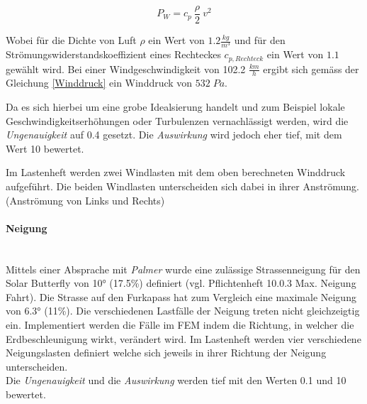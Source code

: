   \begin{equation}
    \label{Winddruck}
    P_W = c_p \: \frac{\rho}{2}\: v^2
  \end{equation}

  Wobei für die Dichte von Luft $\rho$ ein Wert von $1.2 \frac{kg}{m^3}$ und für den Strömungswiderstandskoeffizient eines Rechteckes $c_{p,Rechteck}$ ein Wert von $1.1$ gewählt wird. Bei einer Windgeschwindigkeit von 102.2 $\frac{km}{h}$ ergibt sich gemäss der Gleichung \ref{Winddruck} ein Winddruck von $532 \; Pa$.

  Da es sich hierbei um eine grobe Idealsierung handelt und zum Beispiel lokale Geschwindigkeitserhöhungen oder Turbulenzen vernachlässigt werden, wird die \emph{Ungenauigkeit} auf 0.4 gesetzt. Die \emph{Auswirkung} wird jedoch eher tief, mit dem Wert 10 bewertet.

  Im Lastenheft werden zwei Windlasten mit dem oben berechneten Winddruck aufgeführt. Die beiden Windlasten unterscheiden sich dabei in ihrer Anströmung. (Anströmung von Links und Rechts)


  \paragraph{Neigung}\mbox{}\\
  Mittels einer Absprache mit \emph{Palmer} wurde eine zulässige Strassenneigung für den Solar Butterfly von 10° (17.5\%) definiert (vgl. Pflichtenheft 10.0.3 Max. Neigung Fahrt). Die Strasse auf den Furkapass hat zum Vergleich eine maximale Neigung von 6.3° (11\%). Die verschiedenen Lastfälle der Neigung treten nicht gleichzeigtig ein. Implementiert werden die Fälle im FEM indem die Richtung, in welcher die Erdbeschleunigung wirkt, verändert wird. Im Lastenheft werden vier verschiedene Neigungslasten definiert welche sich jeweils in ihrer Richtung der Neigung unterscheiden.\\
  Die \emph{Ungenauigkeit} und die \emph{Auswirkung} werden tief mit den Werten 0.1  und 10 bewertet.



